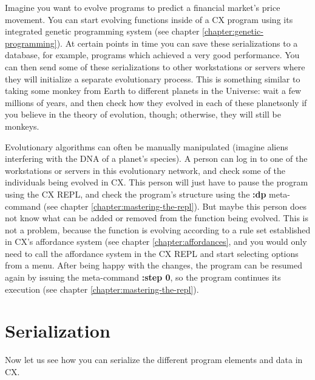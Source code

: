 \documentclass[11pt,fleqn,openany]{book} %
\begin{document}
Imagine you want to evolve programs to predict a financial market's price movement. You can start evolving functions inside of a CX program using its integrated genetic programming system (see chapter \ref{chapter:genetic-programming}). At certain points in time you can save these serializations to a database, for example, programs which achieved a very good performance. You can then send some of these serializations to other workstations or servers where they will initialize a separate evolutionary process. This is something similar to taking some monkey from Earth to different planets in the Universe: wait a few millions of years, and then check how they evolved in each of these planets{only if you believe in the theory of evolution, though; otherwise, they will still be monkeys}.

Evolutionary algorithms can often be manually manipulated (imagine aliens interfering with the DNA of a planet's species). A person can log in to one of the workstations or servers in this evolutionary network, and check some of the individuals being evolved in CX. This person will just have to pause the program using the CX REPL, and check the program's structure using the \textbf{:dp} meta-command (see chapter \ref{chapter:mastering-the-repl}). But maybe this person does not know what can be added or removed from the function being evolved. This is not a problem, because the function is evolving according to a rule set established in CX's affordance system (see chapter \ref{chapter:affordances}, and you would only need to call the affordance system in the CX REPL and start selecting options from a menu. After being happy with the changes, the program can be resumed again by issuing the meta-command \textbf{:step 0}, so the program continues its execution (see chapter \ref{chapter:mastering-the-repl}).


\section{Serialization}
\label{section:serialization}

Now let us see how you can serialize the different program elements and data in CX.
\end{document}

